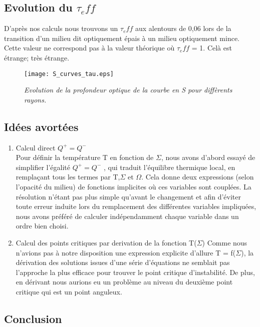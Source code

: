 \subsection{Evolution du $\tau_eff$}

D'après nos calculs nous trouvons un $\tau_eff$ aux alentours de 0,06 lors de la transition d'un milieu dit optiquement épais à un milieu optiquement mince. Cette valeur ne correspond pas à la valeur théorique où $\tau_eff$ = 1. 
Celà est étrange; très étrange.

\begin{figure}[htb!]
	\centering
	\texttt{[image: S\_curves\_tau.eps]}
	\caption{\textit{Evolution de la profondeur optique de la courbe en S pour diffèrents rayons.}  }
	\label{Fig::bench}
\end{figure}

\subsection{Idées avortées}
\begin{enumerate}

\item Calcul direct $Q^+ = Q^-$
\\
Pour définir la température T en fonction de $\Sigma$, nous avons d'abord essayé de simplifier l'égalité $Q^+ = Q^-$ , qui traduit l'équilibre thermique local, en remplaçant tous les termes par T,$\Sigma$ et $\Omega$. Cela donne deux expressions (selon l'opacité du milieu) de fonctions implicites où ces variables sont couplées.
La résolution n'étant pas plus simple qu'avant le changement et afin d'éviter toute erreur induite lors du remplacement des différentes variables impliquées, nous avons préféré de calculer indépendamment chaque variable dans un ordre bien choisi. 
\\

\item Calcul des points critiques par derivation de la fonction T($\Sigma$)
Comme nous n'avions pas à notre disposition une expression explicite d'allure T = f($\Sigma$), la dérivation des solutions issues d'une série d'équations ne semblait pas l'approche la plus efficace pour trouver le point critique d'instabilité. De plus, en dérivant nous aurions eu un problème au niveau du deuxième point critique qui est un point anguleux.
\end{enumerate}

\subsection{Conclusion}
